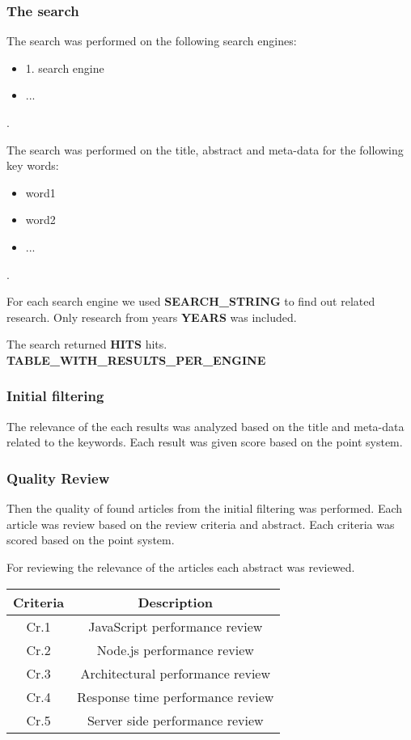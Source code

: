 \subsubsection{The search}
The search was performed on the following search engines: 
\begin{itemize}
    \item 1. search engine
    \item ...
\end{itemize}.

The search was performed on the title, abstract and meta-data for the following key words:
\begin{itemize}
    \item word1
    \item word2
    \item ...
\end{itemize}.

For each search engine we used \textbf{SEARCH\_STRING} to find out related research.
Only research from years \textbf{YEARS} was included.

The search returned \textbf{HITS} hits.
\textbf{TABLE\_WITH\_RESULTS\_PER\_ENGINE}


\subsubsection{Initial filtering}
The relevance of the each results was analyzed based on the title and meta-data related to the keywords. Each result was given score based on the point system.

\subsubsection{Quality Review}
Then the quality of found articles from the initial filtering was performed.
Each article was review based on the review criteria and abstract.
Each criteria was scored based on the point system.

For reviewing the relevance of the articles each abstract was reviewed.

\begin{flushleft}
\begin{tabular}{|c c|} 
 \hline
 Criteria & Description \\ [0.5ex] 
 \hline
  Cr.1 & JavaScript performance review  \\ 
  \hline
  Cr.2 & Node.js performance review  \\ 
  \hline
  Cr.3 & Architectural performance review  \\ 
  \hline
  Cr.4 & Response time performance review  \\ 
  \hline
  Cr.5 & Server side performance review  \\ 
  \hline
\end{tabular}
\end{flushleft}


